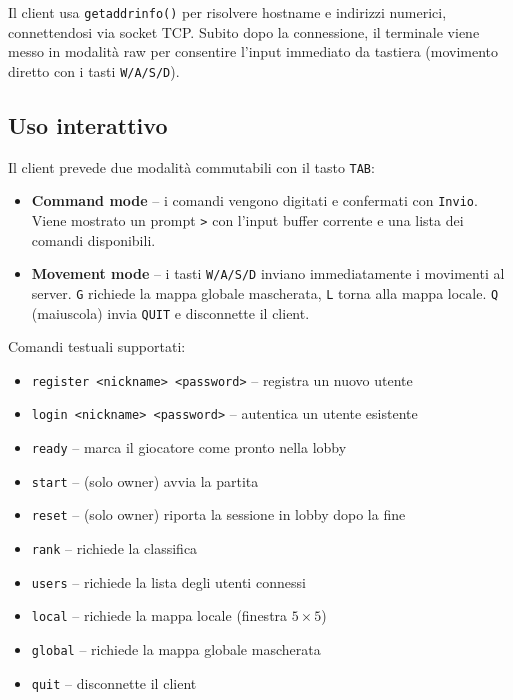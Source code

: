 \documentclass[a4paper,11pt]{article}
\begin{document}
Il client usa \texttt{getaddrinfo()} per risolvere hostname e indirizzi numerici,
connettendosi via socket TCP. Subito dopo la connessione, il terminale viene messo
in modalità raw per consentire l'input immediato da tastiera (movimento diretto
con i tasti \texttt{W/A/S/D}).

\subsection{Uso interattivo}

Il client prevede due modalità commutabili con il tasto \texttt{TAB}:
\begin{itemize}[topsep=0.3em]
    \item \textbf{Command mode} -- i comandi vengono digitati e confermati con
          \texttt{Invio}. Viene mostrato un prompt \texttt{>} con l'input buffer
          corrente e una lista dei comandi disponibili.
    \item \textbf{Movement mode} -- i tasti \texttt{W/A/S/D} inviano immediatamente
          i movimenti al server. \texttt{G} richiede la mappa globale mascherata,
          \texttt{L} torna alla mappa locale. \texttt{Q} (maiuscola) invia \texttt{QUIT}
          e disconnette il client.
\end{itemize}

Comandi testuali supportati:
\begin{itemize}[topsep=0.3em]
    \item \texttt{register <nickname> <password>} -- registra un nuovo utente
    \item \texttt{login <nickname> <password>} -- autentica un utente esistente
    \item \texttt{ready} -- marca il giocatore come pronto nella lobby
    \item \texttt{start} -- (solo owner) avvia la partita
    \item \texttt{reset} -- (solo owner) riporta la sessione in lobby dopo la fine
    \item \texttt{rank} -- richiede la classifica
    \item \texttt{users} -- richiede la lista degli utenti connessi
    \item \texttt{local} -- richiede la mappa locale (finestra $5\times5$)
    \item \texttt{global} -- richiede la mappa globale mascherata
    \item \texttt{quit} -- disconnette il client
\end{itemize}
\end{document}
